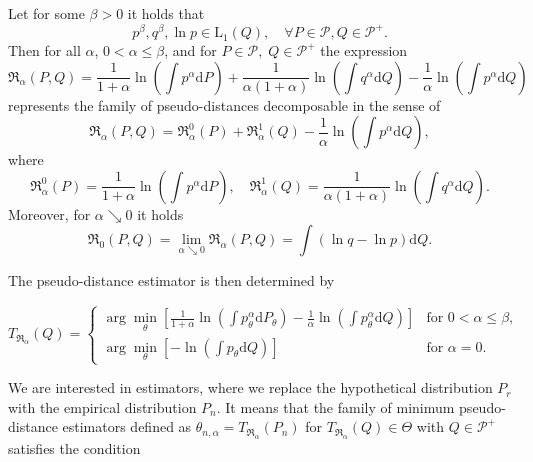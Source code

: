 {\begin{theorem}
Let for some $\beta>0$ it holds that
	\begin{equation*}
			p^\beta, q^\beta,\ln{p} \in \mathrm{L}_1(Q), \quad \forall P \in \mathcal{P}, Q \in \mathcal{P^+}.
	\end{equation*}
	Then for all $\alpha$, $0 < \alpha \leq \beta$, and for $P \in \mathcal{P}, \; Q \in \mathcal{P^+} $ the expression
	\begin{equation}
		\mathfrak{R}_\alpha (P,Q) = \dfrac{1}{1+\alpha}\ln{\left( \int{p^\alpha \mathrm{d}P } \right)} +
		\dfrac{1}{\alpha (1+\alpha)}\ln{\left( \int{q^\alpha \mathrm{d}Q } \right)} -
		\dfrac{1}{\alpha} \ln{\left( \int{p^\alpha \mathrm{d}Q } \right)}
	\end{equation}
		represents the family of pseudo-distances decomposable in the sense of
	\begin{equation*}
		\mathfrak{R}_\alpha (P,Q) = \mathfrak{R}_\alpha^0 (P) + \mathfrak{R}_\alpha^1 (Q) - \dfrac{1}{\alpha} \ln{\left( \int{p^\alpha \mathrm{d}Q } \right)},
	\end{equation*}	
	where
	\begin{equation*}
		\mathfrak{R}_\alpha^0 (P) = \dfrac{1}{1+\alpha}\ln{\left( \int{p^\alpha \mathrm{d}P } \right)}, \quad \mathfrak{R}_\alpha^1 (Q) = \dfrac{1}{\alpha (1+\alpha)}\ln{\left( \int{q^\alpha \mathrm{d}Q } \right)}.
	\end{equation*}
	Moreover, for $\alpha \searrow 0$ it holds
	\begin{equation*}
		\mathfrak{R}_0 (P,Q) = \lim_{\alpha \searrow 0} \mathfrak{R}_\alpha (P,Q) =  \int{\left( \ln{q} - \ln{p} \right)\mathrm{d}Q}.
	\end{equation*}
\end{theorem}

\noindent The \R pseudo-distance estimator is then determined by

\begin{equation}
	T_{\mathfrak{R}_\alpha}(Q) =
	\begin{cases}
		 \arg \min_{\theta} \left[\frac{1}{1+\alpha} \ln(\int p_\theta^\alpha\mathrm{d}P_\theta) - \frac{1}{\alpha} \ln(\int p_\theta^\alpha\mathrm{d}Q) \right] & \text{for } 0 < \alpha \leq \beta, \\
		 \arg \min_{\theta} \left[- \ln(\int p_\theta\mathrm{d}Q) \right] & \text{for } \alpha = 0.
	\end{cases}	
\end{equation}

We are interested in estimators, where we replace the hypothetical distribution $P_r$ with the empirical distribution $P_n$. It means that the family of minimum \R pseudo-distance estimators defined as $\theta_{n,\alpha} = T_{\mathfrak{R}_\alpha}(P_n)$ for $T_{\mathfrak{R}_\alpha}(Q) \in \Theta$ with $Q \in \mathcal{P}^+$ satisfies the condition

}
